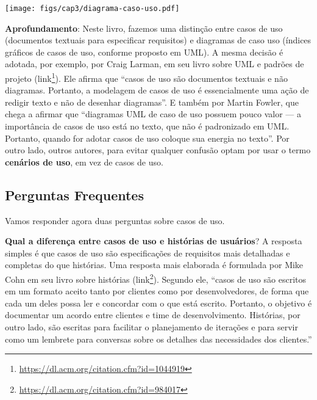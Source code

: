 \documentclass[
  11pt,
  twoside]{book}
\DeclareRobustCommand{\href}[2]{#2\footnote{\url{#1}}}
\newenvironment{esmbox}{\centering \vspace{1.5ex} \begin{tcolorbox}[breakable, colback=backcolor, width=4.9in]}{\end{tcolorbox} \vspace{1.5ex}}
\let\origfigure\figure
\let\endorigfigure\endfigure
\renewenvironment{figure}[1][2] {
    \expandafter\origfigure\expandafter[!h]
} {
    \endorigfigure
}
\begin{document}
\begin{figure}
\centering
\texttt{[image: figs/cap3/diagrama-caso-uso.pdf]}
\caption{Exemplo de Diagrama UML de Casos de Uso}
\end{figure}


\begin{esmbox}

\textbf{Aprofundamento}: Neste livro, fazemos uma distinção entre casos
de uso (documentos textuais para especificar requisitos) e diagramas de
caso uso (índices gráficos de casos de uso, conforme proposto em UML). A
mesma decisão é adotada, por exemplo, por Craig Larman, em seu livro
sobre UML e padrões de projeto
(\href{https://dl.acm.org/citation.cfm?id=1044919}{link}). Ele afirma
que ``casos de uso são documentos textuais e não diagramas. Portanto, a
modelagem de casos de uso é essencialmente uma ação de redigir texto e
não de desenhar diagramas''. E também por Martin Fowler, que chega a
afirmar que ``diagramas UML de caso de uso possuem pouco valor --- a
importância de casos de uso está no texto, que não é padronizado em UML.
Portanto, quando for adotar casos de uso coloque sua energia no texto''.
Por outro lado, outros autores, para evitar qualquer confusão optam por
usar o termo \textbf{cenários de uso}, em vez de casos de uso.

\end{esmbox}

\hypertarget{perguntas-frequentes-4}{%
\subsection{Perguntas Frequentes}\label{perguntas-frequentes-4}}

Vamos responder agora duas perguntas sobre casos de uso.

\textbf{Qual a diferença entre casos de uso e histórias de usuários}? A
resposta simples é que casos de uso são especificações de requisitos
mais detalhadas e completas do que histórias. Uma resposta mais
elaborada é formulada por Mike Cohn em seu livro sobre histórias
(\href{https://dl.acm.org/citation.cfm?id=984017}{link}). Segundo ele,
``casos de uso são escritos em um formato aceito tanto por clientes como
por desenvolvedores, de forma que cada um deles possa ler e concordar
com o que está escrito. Portanto, o objetivo é documentar um acordo
entre clientes e time de desenvolvimento. Histórias, por outro lado, são
escritas para facilitar o planejamento de iterações e para servir como
um lembrete para conversas sobre os detalhes das necessidades dos
clientes.''
\end{document}
